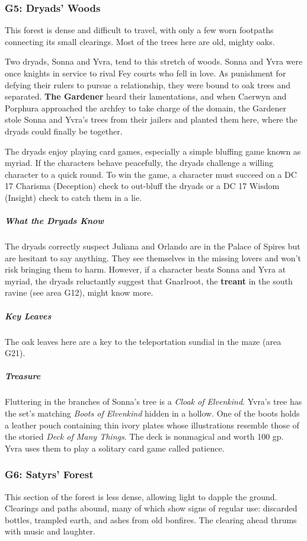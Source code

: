 \documentclass[10pt,a4paper,twoside,bg=print,twocolumn,openany,nodeprecatedcode]{dndbook}
\begin{document}
\subsubsection{G5: Dryads' Woods}
\begin{DndReadAloud}{}
This forest is dense and difficult to travel, with only a few worn footpaths connecting its small clearings. Most of the trees here are old, mighty oaks.

\end{DndReadAloud}

Two dryads, Sonna and Yvra, tend to this stretch of woods. Sonna and Yvra were once knights in service to rival Fey courts who fell in love. As punishment for defying their rulers to pursue a relationship, they were bound to oak trees and separated. \textbf{The Gardener} heard their lamentations, and when Caerwyn and Porphura approached the archfey to take charge of the domain, the Gardener stole Sonna and Yvra's trees from their jailers and planted them here, where the dryads could finally be together.

The dryads enjoy playing card games, especially a simple bluffing game known as myriad. If the characters behave peacefully, the dryads challenge a willing character to a quick round. To win the game, a character must succeed on a DC 17 Charisma (Deception) check to out-bluff the dryads or a DC 17 Wisdom (Insight) check to catch them in a lie.

\subparagraph{What the Dryads Know}
The dryads correctly suspect Juliana and Orlando are in the Palace of Spires but are hesitant to say anything. They see themselves in the missing lovers and won't risk bringing them to harm. However, if a character beats Sonna and Yvra at myriad, the dryads reluctantly suggest that Gnarlroot, the \textbf{treant} in the south ravine (see area G12), might know more.

\subparagraph{Key Leaves}
The oak leaves here are a key to the teleportation sundial in the maze (area G21).

\subparagraph{Treasure}
Fluttering in the branches of Sonna's tree is a \textit{Cloak of Elvenkind}. Yvra's tree has the set's matching \textit{Boots of Elvenkind} hidden in a hollow. One of the boots holds a leather pouch containing thin ivory plates whose illustrations resemble those of the storied \textit{Deck of Many Things}. The deck is nonmagical and worth 100 gp. Yvra uses them to play a solitary card game called patience.

\subsubsection{G6: Satyrs' Forest}
\begin{DndReadAloud}{}
This section of the forest is less dense, allowing light to dapple the ground. Clearings and paths abound, many of which show signs of regular use: discarded bottles, trampled earth, and ashes from old bonfires. The clearing ahead thrums with music and laughter.

\end{DndReadAloud}
\end{document}
